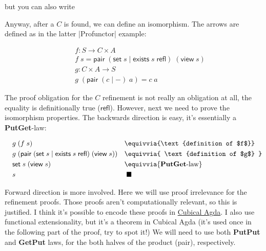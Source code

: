 \documentclass{article}
\begin{document}

but you can also write


Anyway, after a $C$ is found, we can define an isomorphism.
The arrows are defined as in the latter |Profunctor| example:

\begin{equation}
\begin{aligned}
\quad &f : S \to C \times A \\
      &f\; s = \mathsf{pair}\; (\mathsf{set}\;s \mid \mathsf{exists}\;s\;\mathsf{refl})\; (\mathsf{view}\; s) \\
      &g : C \times A \to S \\
      &g\;(\mathsf{pair}\; (c \mid -)\; a) = c\; a
\end{aligned}
\end{equation}

The proof obligation for the $C$ refinement is not really an obligation at all, the equality is definitionally true ($\mathsf{refl}$).
However, next we need to prove the isomorphism properties.
The backwards direction is easy, it's essentially a \textbf{PutGet}-law:

\begin{equation}
\begin{aligned}
\quad &g\; (f\; s) &&\equivvia{\text{definition of $f$}} \\
      &g\; (\mathsf{pair}\; (\mathsf{set}\;s \mid \mathsf{exists}\;s\;\mathsf{refl})\; (\mathsf{view}\; s)) &&\equivvia{ \text{definition of $g$} } \\
      &\mathsf{set}\;s\;(\mathsf{view}\;s) &&\equivvia{ \text{\textbf{PutGet}-law} } \\
      &s &&\;\blacksquare
\end{aligned}
\end{equation}

Forward direction is more involved. Here we will use proof irrelevance for the refinement proofs.
Those proofs aren't computationally relevant, so this is justified.
I think it's possible to encode these proofs in \href{https://homotopytypetheory.org/2018/12/06/cubical-agda/}{Cubical Agda}.
I also use functional extensionality,
but it's a theorem in Cubical Agda
(it's used once in the following part of the proof, try to spot it!)
We will need to use both \textbf{PutPut} and \textbf{GetPut} laws,
for the both halves of the product (pair), respectively.
\end{document}
